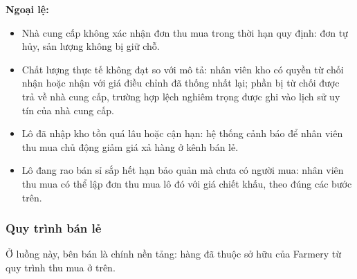 \noindent\textbf{Ngoại lệ:}
\begin{itemize}
    \item Nhà cung cấp không xác nhận đơn thu mua trong thời hạn quy định: đơn tự hủy, sản lượng không bị giữ chỗ.
    \item Chất lượng thực tế không đạt so với mô tả: nhân viên kho có quyền từ chối nhận hoặc nhận với giá điều chỉnh đã thống nhất lại; phần bị từ chối được trả về nhà cung cấp, trường hợp lệch nghiêm trọng được ghi vào lịch sử uy tín của nhà cung cấp.
    \item Lô đã nhập kho tồn quá lâu hoặc cận hạn: hệ thống cảnh báo để nhân viên thu mua chủ động giảm giá xả hàng ở kênh bán lẻ.
    \item Lô đang rao bán sỉ sắp hết hạn bảo quản mà chưa có người mua: nhân viên thu mua có thể lập đơn thu mua lô đó với giá chiết khấu, theo đúng các bước trên.
\end{itemize}

\subsubsection*{Quy trình bán lẻ}

Ở luồng này, bên bán là chính nền tảng: hàng đã thuộc sở hữu của Farmery từ quy trình thu mua ở trên.

